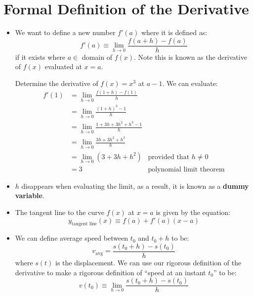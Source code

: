 \section{Formal Definition of the Derivative}
\begin{itemize}
    \item We want to define a new number $f'(a)$ where it is defined as:
    \begin{equation}
        f'(a) \equiv \lim_{h\to 0} \frac{f(a+h)-f(a)}{h}
        \label{eq:}
    \end{equation}
    if it exists where $a \in$ domain of $f(x)$. Note this is known as the derivative of $f(x)$ evaluated at $x=a$.
    \begin{example}
        Determine the derivative of $f(x)=x^3$ at $a-1$. We can evaluate:
        \begin{align}
            f'(1)&=\lim_{h\to 0} \frac{f(1+h)-f(1)}{h} \\ 
            &=\lim_{h\to 0} \frac{(1+h)^3-1}{h} \\
            &= \lim_{h\to 0}\frac{1+3h+3h^2+h^3-1}{h} \\ 
            &= \lim_{h\to 0}\frac{3h+3h^2+h^3}{h} \\ 
            &= \lim_{h\to 0} (3+3h+h^2) & \text{provided that } h\neq 0 \\ 
            &= 3 &\text{polynomial limit theorem}
            \label{eq:}
        \end{align}
    \end{example}
    \item $h$ disappears when evaluating the limit, as a result, it is known as a \textbf{dummy variable}.
    \item The tangent line to the curve $f(x)$ at $x=a$ is given by the equation:
    \begin{equation}
        y_\text{tangent line}(x)\equiv f(a)+f'(a)(x-a)
        \label{eq:}
    \end{equation}
    \item We can define average speed between $t_0$ and $t_0+h$ to be:
    \begin{equation}
        v_\text{avg} =\frac{s(t_0+h)-s(t_0)}{h}
        \label{eq:}
    \end{equation}
    where $s(t)$ is the displacement. We can use our rigorous definition of the derivative to make a rigorous definition of ``speed at an instant $t_0$'' to be:
    \begin{equation}
        v(t_0) \equiv \lim_{h\to 0} \frac{s(t_0+h)-s(t_0)}{h}

\end{equation}
\end{itemize}

